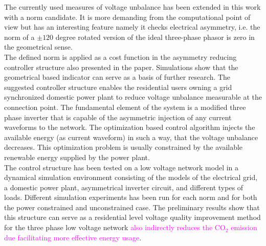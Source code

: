     The currently used measures of voltage unbalance has been extended in this work with a norm candidate. It is more demanding from the computational point of view but has an interesting feature namely it checks electrical asymmetry, i.e. the norm of a $\pm120$ degree  rotated version of the ideal three-phase phasor is zero in the geometrical sense.\\
    The defined norm is applied as a cost function in the asymmetry reducing controller structure also presented in the paper. Simulations show that the geometrical based indicator can serve as a basis of further research. The suggested controller structure enables the residential users owning a grid synchronized domestic power plant to reduce voltage unbalance measurable at the connection point. The fundamental element of the system is a modified three phase inverter that is capable of the asymmetric injection of any current waveforms to the network. The optimization based control algorithm injects the available energy (as current waveform) in such a way, that the voltage unbalance decreases. This optimization problem is usually constrained by the available renewable energy supplied by the power plant.\\
    The control structure has been tested on a low voltage network model in a dynamical simulation environment consisting of the models of the electrical grid, a domestic power plant,  asymmetrical inverter circuit, and different types of loads. Different simulation experiments has been run for each norm and for both the power constrained and unconstrained case. The preliminary results show that this structure can serve as a residential level voltage quality improvement method for the three phase low voltage network \textcolor{magenta}{also indirectly reduces the CO${}_2$ emission due facilitating more effective energy usage}.

